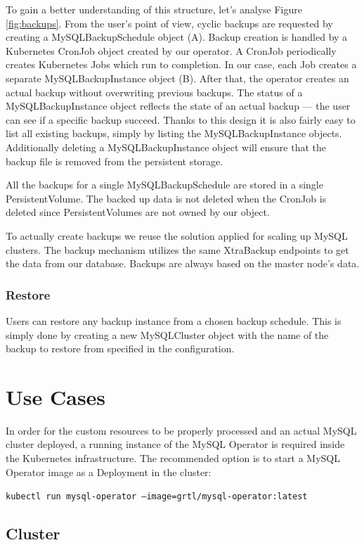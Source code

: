 To gain a better understanding of this structure, let’s analyse Figure
\ref{fig:backups}. From the user's point of view, cyclic backups are requested
by creating a MySQLBackupSchedule object (A). Backup creation is handled
by a Kubernetes CronJob object created by our operator. A CronJob periodically
creates Kubernetes Jobs which run to completion. In our case, each
Job creates a separate MySQLBackupInstance object (B). After that, the
operator creates an actual backup without overwriting previous
backups. The status of a MySQLBackupInstance object reflects the state of
an actual backup --- the user can see if a specific backup succeed. Thanks
to this design it is also fairly easy to list all existing backups,
simply by listing the MySQLBackupInstance objects. Additionally deleting a
MySQLBackupInstance object will ensure that the backup file is removed from
the persistent storage.

All the backups for a single MySQLBackupSchedule are stored in a single
PersistentVolume. The backed up data is not deleted when the CronJob is
deleted since PersistentVolumes are not owned by our object.

To actually create backups we reuse the solution applied for scaling
up MySQL clusters. The backup mechanism utilizes the same XtraBackup endpoints
to get the data from our database. Backups are always based on the master
node’s data.

\subsubsection*{Restore}
Users can restore any backup instance from a chosen backup schedule. This is simply done by creating
a new MySQLCluster object with the name of the backup to restore from specified in the
configuration.

\section{Use Cases}
In order for the custom resources to be properly processed and an actual MySQL cluster deployed, a
running instance of the MySQL Operator is required inside the Kubernetes infrastructure. The
recommended option is to start a MySQL Operator image as a Deployment in the cluster:

\texttt{kubectl run mysql-operator --image=grtl/mysql-operator:latest}

\subsection{Cluster}
